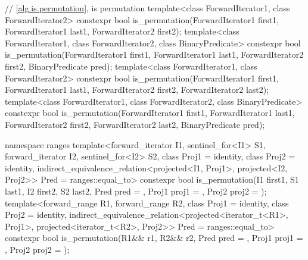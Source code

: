 \begin{codeblock}
{  // \ref{alg.is.permutation}, is permutation
  template<class ForwardIterator1, class ForwardIterator2>
    constexpr bool is_permutation(ForwardIterator1 first1, ForwardIterator1 last1,
                                  ForwardIterator2 first2);
  template<class ForwardIterator1, class ForwardIterator2, class BinaryPredicate>
    constexpr bool is_permutation(ForwardIterator1 first1, ForwardIterator1 last1,
                                  ForwardIterator2 first2, BinaryPredicate pred);
  template<class ForwardIterator1, class ForwardIterator2>
    constexpr bool is_permutation(ForwardIterator1 first1, ForwardIterator1 last1,
                                  ForwardIterator2 first2, ForwardIterator2 last2);
  template<class ForwardIterator1, class ForwardIterator2, class BinaryPredicate>
    constexpr bool is_permutation(ForwardIterator1 first1, ForwardIterator1 last1,
                                  ForwardIterator2 first2, ForwardIterator2 last2,
                                  BinaryPredicate pred);

  namespace ranges {
    template<forward_iterator I1, sentinel_for<I1> S1, forward_iterator I2,
             sentinel_for<I2> S2, class Proj1 = identity, class Proj2 = identity,
             indirect_equivalence_relation<projected<I1, Proj1>,
                                           projected<I2, Proj2>> Pred = ranges::equal_to>
      constexpr bool is_permutation(I1 first1, S1 last1, I2 first2, S2 last2,
                                    Pred pred = {},
                                    Proj1 proj1 = {}, Proj2 proj2 = {});
    template<forward_range R1, forward_range R2,
             class Proj1 = identity, class Proj2 = identity,
             indirect_equivalence_relation<projected<iterator_t<R1>, Proj1>,
                                           projected<iterator_t<R2>, Proj2>>
               Pred = ranges::equal_to>
      constexpr bool is_permutation(R1&& r1, R2&& r2, Pred pred = {},
                                    Proj1 proj1 = {}, Proj2 proj2 = {});
  }

}
\end{codeblock}
